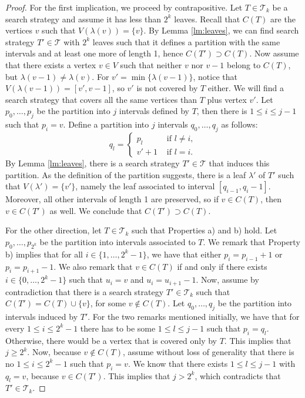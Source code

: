 \documentclass[11pt]{article}
\newcommand{\BSTs}{\mathcal{T}}
\newcommand\+{\mkern2mu}
\begin{document}
\begin{proof}
    For the first implication, we proceed by contrapositive. Let $T \in \BSTs_k$ be a search strategy and assume it has less than $2^k$ leaves. Recall that $C(T)$ are the vertices $v$ such that $V(\lambda(v)) = \{v\}$. By Lemma \ref{lm:leaves}, we can find search strategy $T' \in \BSTs$ with $2^k$ leaves such that it defines a partition with the same intervals and at least one more of length 1, hence $C(T') \supset C(T)$. Now assume that there exists a vertex $v \in V$ such that neither $v$ nor $v - 1$ belong to $C(T)$, but $\lambda(v-1) \neq \lambda(v)$. For $v' = \min\{\lambda(v-1)\}$, notice that $V(\lambda(v-1)) = [v', v-1]$, so $v'$ is not covered by $T$ either. We will find a search strategy that covers all the same vertices than $T$ plus vertex $v'$. Let $p_0, \ldots, p_j$ be the partition into $j$ intervals defined by $T$, then there is $1 \leq i \leq j-1$ such that $p_i = v$. Define a partition into $j$ intervals $q_0, \ldots, q_j$ as follows: 
    $$q_l = \begin{cases}
        p_l & \text{ if $l \neq i$},\\
        v'+1 & \text{ if $l = i$}.
    \end{cases}$$
    By Lemma \ref{lm:leaves}, there is a search strategy $T' \in \BSTs$ that induces this partition. As the definition of the partition suggests, there is a leaf $\lambda'$ of $T'$ such that $V(\lambda') = \{v'\}$, namely the leaf associated to interval $[q_{i-1}, q_i-1]$. Moreover, all other intervals of length 1 are preserved, so if $v \in C(T)$, then $v\in C(T')$ as well. We conclude that $C(T') \supset C(T)$.

    For the other direction, let $T \in \BSTs_k$ such that Properties a) and b) hold. Let $p_0, \ldots, p_{2^k}$ be the partition into intervals associated to $T$. We remark that Property b) implies that for all $i \in \{1, \ldots, 2^k-1\}$, we have that either $p_i = p_{i-1} + 1$ or $p_i = p_{i+1} - 1$. We also remark that $v \in C(T)$ if and only if there exists $i \in \{0, \ldots, 2^k-1\}$ such that $u_i = v$ and $u_i = u_{i+1}-1$. Now, assume by contradiction that there is a search strategy $T' \in \BSTs_k$ such that $C(T') = C(T) \cup \{v\}$, for some $v \not \in C(T)$. Let $q_0, \ldots, q_j$ be the partition into intervals induced by $T'$. For the two remarks mentioned initially, we have that for every $1 \leq i \leq 2^k-1$ there has to be some $1 \leq l \leq j-1$ such that $p_i = q_l$. Otherwise, there would be a vertex that is covered only by $T$. This implies that $j \geq 2^k$. Now, because $v \not \in C(T)$, assume without loss of generality that there is no $1 \leq i \leq 2^k - 1$ such that $p_i = v$. We know that there exists $1 \leq l \leq j-1$ with $q_l = v$, because $v \in C(T')$. This implies that $j > 2^k$, which contradicts that $T' \in \BSTs_k$. 
\end{proof}
\end{document}
